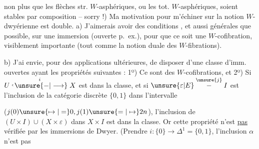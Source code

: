 non plus  que les flèches str. $W$-asphériques, ou les tot. $W$-asphériques, soient stables par composition -- sorry !) Ma motivation pour m'échiner sur la notion $W$-dwyérienne est double. a) J'aimerais avoir des conditions  , et aussi générales que possible, sur une immersion (ouverte p.~ex.), pour que ce soit une $W$-cofibration,  visiblement importante (tout comme la notion duale des $W$-fibrations).

b) J'ai envie, pour des applications ultérieures, de disposer d'une classe d'imm. ouvertes ayant les propriétés suivantes : 1º) Ce sont des $W$-cofibrations, et 2º) Si $U\overset{i}{\lhook\joinrel\unsure{-|\longrightarrow}}X$ est dans la classe,  et si $\unsure{\varepsilon|E}\overset{\unsure{j}}{-}I$ est l'inclusion  de la catégorie discrète $\{0,1\}$ dans l'intervalle

($j(0)\unsure{\mapsto|=}0,j(1)\unsure{=|\mapsto}2n$),  l'inclusion \inserted{$\alpha$} de $(U\times I)\cup(X\times\varepsilon)$ dans $X\times I$ est dans la classe. Or cette  propriété  n'est \uline{pas} vérifiée par les immersions de Dwyer. (Prendre $i:\{0\}\longrightarrow\Delta^1=\{0,1\}$, l'inclusion $\alpha$ n'est pas   
